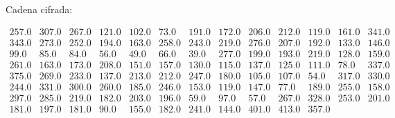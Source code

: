 \documentclass[12pt]{article}
\begin{document}
Cadena cifrada:
\begin{center}
$\begin{array}{lllllllllllll}
257.0 & 307.0 & 267.0 & 121.0 & 102.0 & 73.0 & 191.0 & 172.0 & 206.0 & 212.0 & 119.0 & 161.0 & 341.0\\
343.0 & 273.0 & 252.0 & 194.0 & 163.0 & 258.0 & 243.0 & 219.0 & 276.0 & 207.0 & 192.0 & 133.0 & 146.0\\
99.0 & 85.0 & 84.0 & 56.0 & 49.0 & 66.0 & 39.0 & 277.0 & 199.0 & 193.0 & 219.0 & 128.0 & 159.0\\
261.0 & 163.0 & 173.0 & 208.0 & 151.0 & 157.0 & 130.0 & 115.0 & 137.0 & 125.0 & 111.0 & 78.0 & 337.0\\
375.0 & 269.0 & 233.0 & 137.0 & 213.0 & 212.0 & 247.0 & 180.0 & 105.0 & 107.0 & 54.0 & 317.0 & 330.0\\
244.0 & 331.0 & 300.0 & 260.0 & 185.0 & 246.0 & 153.0 & 119.0 & 147.0 & 77.0 & 189.0 & 255.0 & 158.0\\
297.0 & 285.0 & 219.0 & 182.0 & 203.0 & 196.0 & 59.0 & 97.0 & 57.0 & 267.0 & 328.0 & 253.0 & 201.0\\
181.0 & 197.0 & 181.0 & 90.0 & 155.0 & 182.0 & 241.0 & 144.0 & 401.0 & 413.0 & 357.0\\
\end{array}$
\end{center}

\newpage
\end{document}
